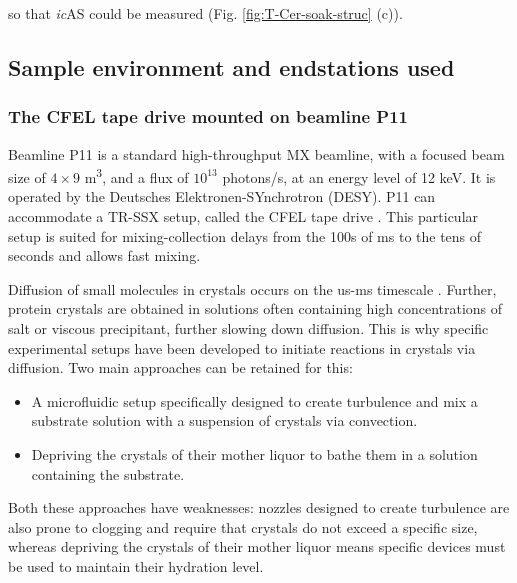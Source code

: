 \parencite{vonstettenCrystalloOpticalSpectroscopy2015} so that \textit{ic}AS could be measured (Fig. \ref{fig:T-Cer-soak-struc} (c)).

\subsection{Sample environment and endstations used}
\subsubsection{The CFEL tape drive mounted on beamline P11}\label{sec:presenting_tpd_P11}

Beamline P11 is a standard high-throughput MX beamline, with a focused beam size of \(4 \times 9 \) \textmu m\textsuperscript{3}, and a flux of \(10^{13}\) photons/s, at an energy level of 12 keV. It is operated by the Deutsches Elektronen-SYnchrotron (DESY). P11 can accommodate a TR-SSX setup, called the CFEL tape drive \parencite{beyerleinMixanddiffuseSerialSynchrotron2017,zielinskiRapidEfficientRoomtemperature2022}. This particular setup is suited for mixing-collection delays from the 100s of ms to the tens of seconds and allows fast mixing.

Diffusion of small molecules in crystals occurs on the us-ms timescale \parencite{makinenReactivityCryoenzymologyEnzymes1977}. Further, protein crystals are obtained in solutions often containing high concentrations of salt or viscous precipitant, further slowing down diffusion. This is why specific experimental setups have been developed to initiate reactions in crystals via diffusion. Two main approaches can be retained for this: 

\begin{itemize}
    \item A microfluidic setup specifically designed to create turbulence and mix a substrate solution with a suspension of crystals via convection. 
    \item Depriving the crystals of their mother liquor to bathe them in a solution containing the substrate. 
\end{itemize}

Both these approaches have weaknesses: nozzles designed to create turbulence are also prone to clogging and require that crystals do not exceed a specific size, whereas depriving the crystals of their mother liquor means specific devices must be used to maintain their hydration level. 


